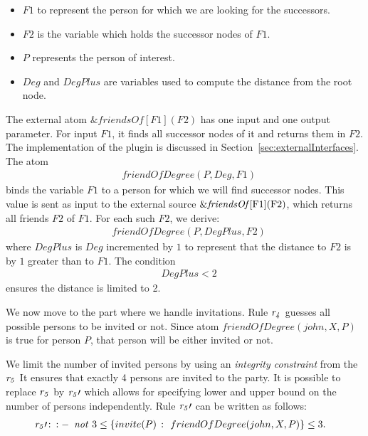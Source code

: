 \documentclass[a4paper, titlepage]{article}
\newcommand{\ext}[3]{\ensuremath{\&{#1}[#2](#3)}}
\DeclareMathOperator{\leftimpl}{:-}
\newcommand{\row}[1]{%
  \ensuremath{\it \color{black} #1 \color{black}}%
}
\begin{document}
\begin{itemize}
\item $\mathit{F1}$ to represent the person for which we are 
looking for the successors.

\item $\mathit{F2}$ is the variable which holds the successor 
nodes of $F1$. 

\item $P$ represents the person of interest.

\item $\mathit{Deg}$ and $DegPlus$ are variables used to 
compute the distance from the root node.
\end{itemize}
The external atom \ext{friendsOf}{F1}{F2} has one input and 
one output parameter. For input $\mathit{F1}$, 
it finds all successor nodes of it and returns them in 
$\mathit{F2}$. The implementation of the plugin is 
discussed in Section~\ref{sec:externalInterfaces}. The atom
\begin{align*}
& \mathit{friendOfDegree(P, Deg, F1)}
\end{align*}
binds the variable $\mathit{F1}$ to a person for which we 
will find successor nodes. This value is sent as input to 
the external source \ext{\mathit{friendsOf}}{$F1$}{$F2$}, 
which returns all friends $F2$ of $F1$. For each such $F2$, 
we derive:
\begin{align*}
& \mathit{friendOfDegree(P, DegPlus, F2)}
\end{align*} 
where $\mathit{DegPlus}$ is $\mathit{Deg}$ incremented by 
$1$ to represent that the distance to $F2$ is by $1$ 
greater than to $F1$. The condition
\begin{align*}
& \mathit{DegPlus < 2}
\end{align*}
ensures the distance is limited to 2. 

We now move to the part where we handle invitations. Rule $\row{r_4}$ guesses all possible 
persons to be invited or not. Since atom 
$\mathit{friendOfDegree(john, X, P)}$ is true for person $P$, that person will be either invited or not.

We limit the number of invited persons by using an 
\emph{integrity constraint} from the $\row{r_5}$
It ensures that exactly 4 persons are invited to the party. 
It is possible to replace $\row{r_5}$ by $\row{r_5} \prime $ which allows for specifying 
lower and upper bound on the number of persons independently. Rule $\row{r_5} \prime $ can be written as follows:
\begin{align*}
\row{r_5} \prime  \colon \leftimpl \ not \ & 3 \leq \{ invite(P) \ \colon \ friendOfDegree(john,X,P)\} \leq 3.
\end{align*} 
  
\end{document}

